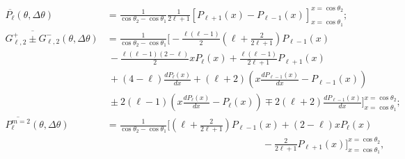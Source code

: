 \begin{align}
\overline{P_\ell} \left( \theta, \Delta \theta \right) &=
\frac{1}{\cos \theta_2 - \cos \theta_1}
\frac{1}{2 \ell + 1}
\left[ P_{\ell + 1} \left( x \right) -
P_{\ell - 1} \left( x \right) \right]
_{x = \cos \theta_1}^{x = \cos \theta_2};
\\[1em]
%
\nonumber
\overline{G_{\ell, 2}^+ \pm G_{\ell, 2}^-}
\left( \theta, \Delta \theta \right) &=
\frac{1}{\cos \theta_2 - \cos \theta_1} \Bigg[
- \frac{\ell \left( \ell - 1 \right)}{2}
\left( \ell + \frac{2}{2 \ell + 1} \right)
P_{\ell - 1} \left( x \right)
\\ \nonumber
&~ - \frac{\ell \left( \ell - 1 \right) \left( 2 - \ell \right)}{2}
x P_\ell \left( x \right)
+ \frac{ \ell \left( \ell - 1 \right)}{2 \ell + 1}
P_{\ell + 1} \left( x \right)
\\ \nonumber
&~ + \left( 4 - \ell \right) \frac{d P_\ell \left( x \right)}{dx}
+ \left( \ell + 2 \right)
\left( x \frac{d P_{\ell - 1} \left( x \right)}{dx}
- P_{\ell - 1} \left( x \right) \right)
\\
&~ \pm 2 \left( \ell - 1 \right)
\left( x \frac{dP_\ell \left( x \right)}{dx}
- P_\ell \left( x \right) \right)
\mp 2 \left( \ell + 2 \right)
\frac{dP_{\ell - 1}\left( x \right)}{dx}
\Bigg]_{x = \cos \theta_1}^{x = \cos \theta_2};
\\[1em]
\nonumber
\overline{P_\ell^{m = 2}} \left( \theta, \Delta \theta \right)
&= \frac{1}{\cos \theta_2 - \cos \theta_1} \Bigg[
\left( \ell + \frac{2}{2 \ell + 1} \right) P_{\ell - 1} \left( x \right)
+ \left( 2 - \ell \right) x P_\ell \left( x \right)
\\ &\qquad\qquad\qquad\qquad\qquad\qquad\qquad\qquad
- \frac{2}{2 \ell + 1} P_{\ell + 1} \left( x \right)
\Bigg]_{x = \cos \theta_1}^{x = \cos \theta_2},
\end{align}
